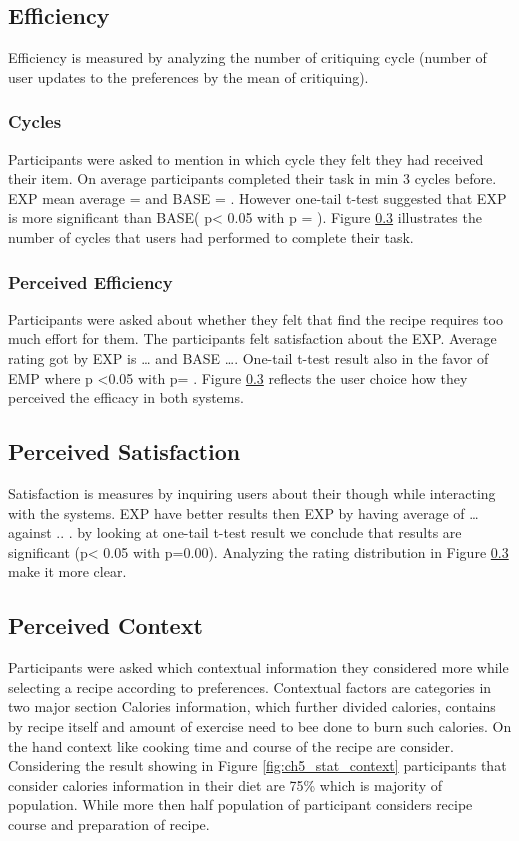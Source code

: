 \subsection{Efficiency}

Efficiency is measured by analyzing the number of critiquing cycle (number of user updates to the preferences by the mean of critiquing). 

\subsubsection{Cycles}
 Participants were asked to mention in which cycle they felt they had received their item.  On average participants completed their task in min 3 cycles before.  EXP mean average  = and BASE  = . However one-tail t-test suggested that EXP is more significant than BASE( p< 0.05 with p = ). Figure \ref{} illustrates the number of cycles that users had performed to complete their task. 

\subsubsection{Perceived Efficiency}

Participants were asked about whether they felt that find the recipe requires too much effort for them. The participants felt satisfaction about the EXP. Average rating got by EXP is … and BASE …. One-tail t-test result also in the favor of EMP where p <0.05 with p= . Figure \ref{} reflects the user choice how they perceived the efficacy in both systems.

\subsection{Perceived Satisfaction}

Satisfaction is measures by inquiring users about their though while interacting with the systems. EXP have better results then EXP by having average of … against .. . by looking at one-tail t-test result we conclude that results are significant (p< 0.05 with p=0.00). Analyzing the rating distribution in Figure \ref{} make it more clear. 

\subsection{Perceived Context}

Participants were asked which contextual information they considered more while selecting a recipe according to preferences. Contextual factors are categories in two major section Calories information, which further divided calories, contains by recipe itself and amount of exercise need to bee done to burn such calories. On the hand context like cooking time and course of the recipe are consider. Considering the result showing in Figure \ref{fig:ch5_stat_context} participants that consider calories information in their diet are 75\% which is majority of population. While more then half population of participant considers recipe course and preparation of recipe. 

